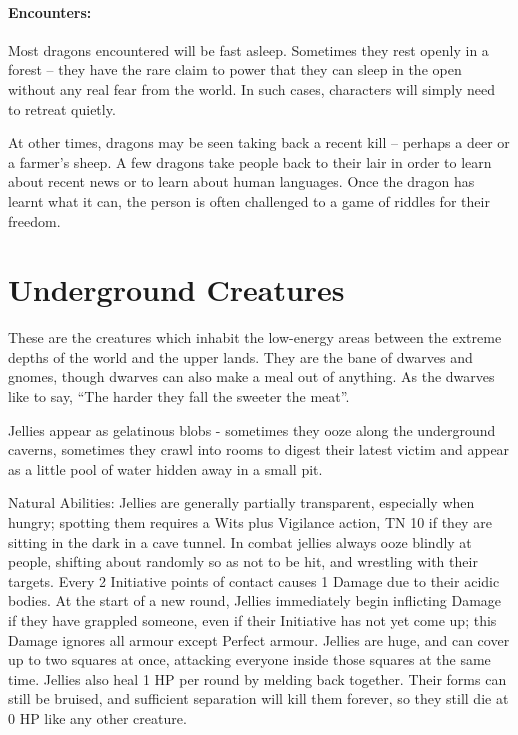 	\paragraph{Encounters:} Most dragons encountered will be fast asleep.  Sometimes they rest openly in a forest -- they have the rare claim to power that they can sleep in the open without any real fear from the world.  In such cases, characters will simply need to retreat quietly.

	At other times, dragons may be seen taking back a recent kill -- perhaps a deer or a farmer's sheep.  A few dragons take people back to their lair in order to learn about recent news or to learn about human languages.  Once the dragon has learnt what it can, the person is often challenged to a game of riddles for their freedom.  

\section{Underground Creatures}

These are the creatures which inhabit the low-energy areas between the extreme depths of the world and the upper lands.  They are the bane of dwarves and gnomes, though dwarves can also make a meal out of anything.  As the dwarves like  to say, ``The harder they fall the sweeter the meat''.

\label{jelly}
\jelly

Jellies appear as gelatinous blobs - sometimes they ooze along the underground caverns, sometimes they crawl into rooms to digest their latest victim and appear as a little pool of water hidden away in a small pit.

Natural Abilities: Jellies are generally partially transparent, especially when hungry; spotting them requires a Wits plus Vigilance action, TN 10 if they are sitting in the dark in a cave tunnel.  In combat jellies always ooze blindly at people, shifting about randomly so as not to be hit, and wrestling with their targets.  Every 2 Initiative points of contact causes 1 Damage due to their acidic bodies.  At the start of a new round, Jellies immediately begin inflicting Damage if they have grappled someone, even if their Initiative has not yet come up; this Damage ignores all armour except Perfect armour.  Jellies are huge, and can cover up to two squares at once, attacking everyone inside those squares at the same time.  Jellies also heal 1 HP per round by melding back together.  Their forms can still be bruised, and sufficient separation will kill them forever, so they still die at 0 HP like any other creature.

